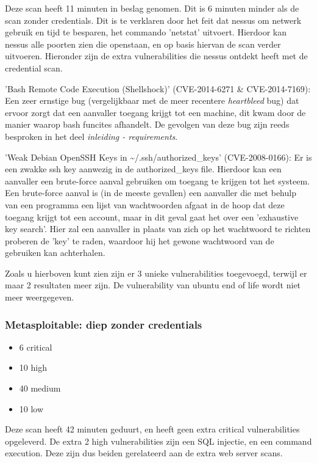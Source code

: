 Deze scan heeft 11 minuten in beslag genomen. Dit is 6 minuten minder als de scan zonder credentials. Dit is te verklaren door het feit dat nessus om netwerk gebruik en tijd te besparen, het commando 'netstat' uitvoert. Hierdoor kan nessus alle poorten zien die openstaan, en op basis hiervan de scan verder uitvoeren. Hieronder zijn de extra vulnerabilities die nessus ontdekt heeft met de credential scan.

'Bash Remote Code Execution (Shellshock)' (CVE-2014-6271 \& CVE-2014-7169): Een zeer ernstige bug (vergelijkbaar met de meer recentere \textit{heartbleed} bug) dat ervoor zorgt dat een aanvaller toegang krijgt tot een machine, dit kwam door de manier waarop bash funcites afhandelt. De gevolgen van deze bug zijn reeds besproken in het deel \textit{inleiding - requirements}.

'Weak Debian OpenSSH Keys in \textasciitilde/.ssh/authorized\_keys' (CVE-2008-0166): Er is een zwakke ssh key aanwezig in de authorized\_keys file. Hierdoor kan een aanvaller een brute-force aanval gebruiken om toegang te krijgen tot het systeem. Een brute-force aanval is (in de meeste gevallen) een aanvaller die met behulp van een programma een lijst van wachtwoorden afgaat in de hoop dat deze toegang krijgt tot een account, maar in dit geval gaat het over een 'exhaustive key search'. Hier zal een aanvaller in plaats van zich op het wachtwoord te richten proberen de 'key' te raden, waardoor hij het gewone wachtwoord van de gebruiken kan achterhalen.

Zoals u hierboven kunt zien zijn er 3 unieke vulnerabilities toegevoegd, terwijl er maar 2 resultaten meer zijn. De vulnerability van ubuntu end of life wordt niet meer weergegeven.

\subsubsection{Metasploitable: diep zonder credentials}

\begin{itemize}
\item 6 critical
\item 10 high
\item 40 medium
\item 10 low
\end{itemize}

Deze scan heeft 42 minuten geduurt, en heeft geen extra critical vulnerabilities opgeleverd. De extra 2 high vulnerabilities zijn een SQL injectie, en een command execution. Deze zijn dus beiden gerelateerd aan de extra web server scans.

